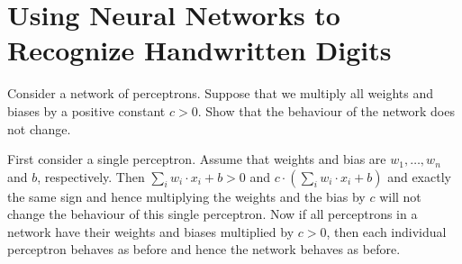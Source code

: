 \chapter{Using Neural Networks to Recognize Handwritten Digits}

\begin{exercise} Consider a network of perceptrons. Suppose that
we multiply all weights and biases by a positive constant $c > 0$. Show 
that the behaviour of the network does not change.
\end{exercise}
\begin{solution}
First consider a single perceptron. Assume that weights and bias are $w_1, \ldots, w_n$ and $b$, respectively. Then $\sum_i w_i \cdot x_i + b > 0$ and 
$c \cdot (\sum_i w_i \cdot x_i + b)$ and exactly the same sign and hence multiplying the weights and the bias by $c$ will not change the behaviour of this single perceptron. Now if all perceptrons in a network have their weights 
and biases multiplied by $c > 0$, then each individual perceptron behaves as before and hence the network behaves as before.
\end{solution}
